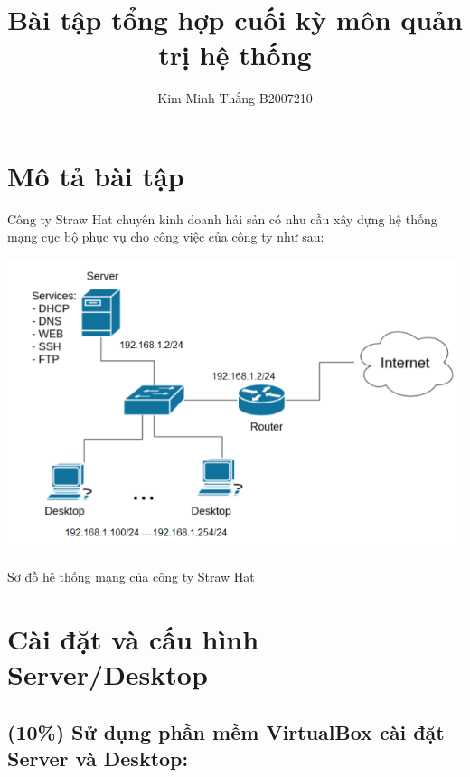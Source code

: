 \documentclass[a4paper, 11pt]{article}
\title{Bài tập tổng hợp cuối kỳ môn quản trị hệ thống}
\author{Kim Minh Thắng B2007210}
\begin{document}
\maketitle
\tableofcontents
\listoffigures
\listoftables
\lstlistoflistings

\section*{Mô tả bài tập}

Công ty Straw Hat chuyên kinh doanh hải sản có nhu cầu xây dựng hệ thống mạng cục bộ phục vụ cho công việc của công ty như sau:

\begin{minipage}{\linewidth}
    \captionsetup{type=figure}
    \includegraphics[width=\linewidth]{images/networks.png}
    \caption{Sơ đồ hệ thống mạng của công ty Straw Hat}
\end{minipage}

\section{Cài đặt và cấu hình Server/Desktop}

\subsection{(10\%) Sử dụng phần mềm VirtualBox cài đặt Server và Desktop:}
\end{document}
